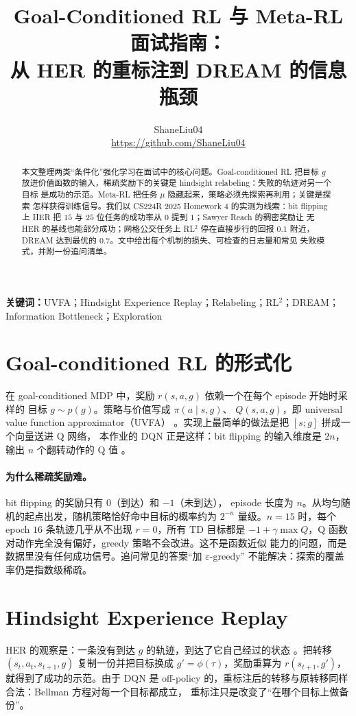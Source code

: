 \documentclass[10pt,twocolumn,a4paper]{ctexart}
\title{\vspace{-1.2em}\textbf{Goal-Conditioned RL 与 Meta-RL 面试指南：\\
从 HER 的重标注到 DREAM 的信息瓶颈}}
\author{ShaneLiu04\\
\small\url{https://github.com/ShaneLiu04}}
\date{}
\begin{document}
\maketitle
\thispagestyle{fancy}

\begin{abstract}
本文整理两类“条件化”强化学习在面试中的核心问题。Goal-conditioned RL 把目标 $g$
放进价值函数的输入，稀疏奖励下的关键是 hindsight relabeling：失败的轨迹对另一个目标
是成功的示范。Meta-RL 把任务 $\mu$ 隐藏起来，策略必须先探索再利用；关键是探索
怎样获得训练信号。我们以 CS224R 2025 Homework 4 的实测为线索：bit flipping
上 HER 把 $15$ 与 $25$ 位任务的成功率从 $0$ 提到 $1$；Sawyer Reach 的稠密奖励让
无 HER 的基线也能部分成功；网格公交任务上 RL$^2$ 停在直接步行的回报 $0.1$
附近，DREAM 达到最优的 $0.7$。文中给出每个机制的损失、可检查的日志量和常见
失败模式，并附一份追问清单。
\end{abstract}

\textbf{关键词：}UVFA；Hindsight Experience Replay；Relabeling；RL$^2$；DREAM；
Information Bottleneck；Exploration

\section{Goal-conditioned RL 的形式化}
在 goal-conditioned MDP 中，奖励 $r(s,a,g)$ 依赖一个在每个 episode 开始时采样的
目标 $g\sim p(g)$\citep{kaelbling1993goals}。策略与价值写成 $\pi(a\mid s,g)$、
$Q(s,a,g)$，即 universal value function approximator（UVFA）
\citep{schaul2015uvfa}。实现上最简单的做法是把 $[s;g]$ 拼成一个向量送进 Q 网络，
本作业的 DQN 正是这样：bit flipping 的输入维度是 $2n$，输出 $n$ 个翻转动作的 Q 值
\citep{mnih2015dqn}。

\paragraph{为什么稀疏奖励难。}bit flipping 的奖励只有 $0$（到达）和 $-1$（未到达），
episode 长度为 $n$。从均匀随机的起点出发，随机策略恰好命中目标的概率约为
$2^{-n}$ 量级。$n=15$ 时，每个 epoch $16$ 条轨迹几乎从不出现 $r=0$，所有 TD 目标都是
$-1+\gamma\max Q$，Q 函数对动作完全没有偏好，greedy 策略不会改进。这不是函数近似
能力的问题，而是数据里没有任何成功信号。追问常见的答案“加 $\varepsilon$-greedy”
不能解决：探索的覆盖率仍是指数级稀疏。

\section{Hindsight Experience Replay}
HER 的观察是：一条没有到达 $g$ 的轨迹，到达了它自己经过的状态
\citep{andrychowicz2017her}。把转移 $(s_t,a_t,s_{t+1},g)$ 复制一份并把目标换成
$g'=\phi(\tau)$，奖励重算为 $r(s_{t+1},g')$，就得到了成功的示范。由于 DQN 是
off-policy 的，重标注后的转移与原转移同样合法：Bellman 方程对每一个目标都成立，
重标注只是改变了“在哪个目标上做备份”。
\end{document}
